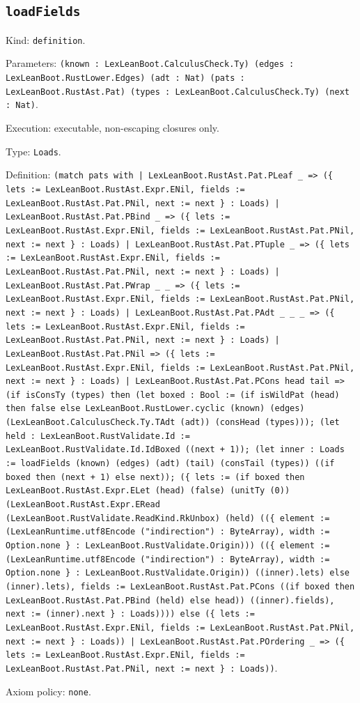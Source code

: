 \documentclass[11pt]{article}
\begin{document}
\subsection*{\texttt{loadFields}}
\noindent Kind: \texttt{definition}.\par
\noindent Parameters: \texttt{(known : LexLeanBoot.CalculusCheck.Ty) (edges : LexLeanBoot.RustLower.Edges) (adt : Nat) (pats : LexLeanBoot.RustAst.Pat) (types : LexLeanBoot.CalculusCheck.Ty) (next : Nat)}.\par
\noindent Execution: executable, non-escaping closures only.\par
\noindent Type: \texttt{Loads}.\par
\noindent Definition: \texttt{(match pats with | LexLeanBoot.RustAst.Pat.PLeaf \_ => (\{ lets := LexLeanBoot.RustAst.Expr.ENil, fields := LexLeanBoot.RustAst.Pat.PNil, next := next \} : Loads) | LexLeanBoot.RustAst.Pat.PBind \_ => (\{ lets := LexLeanBoot.RustAst.Expr.ENil, fields := LexLeanBoot.RustAst.Pat.PNil, next := next \} : Loads) | LexLeanBoot.RustAst.Pat.PTuple \_ => (\{ lets := LexLeanBoot.RustAst.Expr.ENil, fields := LexLeanBoot.RustAst.Pat.PNil, next := next \} : Loads) | LexLeanBoot.RustAst.Pat.PWrap \_ \_ => (\{ lets := LexLeanBoot.RustAst.Expr.ENil, fields := LexLeanBoot.RustAst.Pat.PNil, next := next \} : Loads) | LexLeanBoot.RustAst.Pat.PAdt \_ \_ \_ => (\{ lets := LexLeanBoot.RustAst.Expr.ENil, fields := LexLeanBoot.RustAst.Pat.PNil, next := next \} : Loads) | LexLeanBoot.RustAst.Pat.PNil => (\{ lets := LexLeanBoot.RustAst.Expr.ENil, fields := LexLeanBoot.RustAst.Pat.PNil, next := next \} : Loads) | LexLeanBoot.RustAst.Pat.PCons head tail => (if isConsTy (types) then (let boxed : Bool := (if isWildPat (head) then false else LexLeanBoot.RustLower.cyclic (known) (edges) (LexLeanBoot.CalculusCheck.Ty.TAdt (adt)) (consHead (types))); (let held : LexLeanBoot.RustValidate.Id := LexLeanBoot.RustValidate.Id.IdBoxed ((next + 1)); (let inner : Loads := loadFields (known) (edges) (adt) (tail) (consTail (types)) ((if boxed then (next + 1) else next)); (\{ lets := (if boxed then LexLeanBoot.RustAst.Expr.ELet (head) (false) (unitTy (0)) (LexLeanBoot.RustAst.Expr.ERead (LexLeanBoot.RustValidate.ReadKind.RkUnbox) (held) ((\{ element := (LexLeanRuntime.utf8Encode ("indirection") : ByteArray), width := Option.none \} : LexLeanBoot.RustValidate.Origin))) ((\{ element := (LexLeanRuntime.utf8Encode ("indirection") : ByteArray), width := Option.none \} : LexLeanBoot.RustValidate.Origin)) ((inner).lets) else (inner).lets), fields := LexLeanBoot.RustAst.Pat.PCons ((if boxed then LexLeanBoot.RustAst.Pat.PBind (held) else head)) ((inner).fields), next := (inner).next \} : Loads)))) else (\{ lets := LexLeanBoot.RustAst.Expr.ENil, fields := LexLeanBoot.RustAst.Pat.PNil, next := next \} : Loads)) | LexLeanBoot.RustAst.Pat.POrdering \_ => (\{ lets := LexLeanBoot.RustAst.Expr.ENil, fields := LexLeanBoot.RustAst.Pat.PNil, next := next \} : Loads))}.\par
\noindent Axiom policy: \texttt{none}.\par
\end{document}
